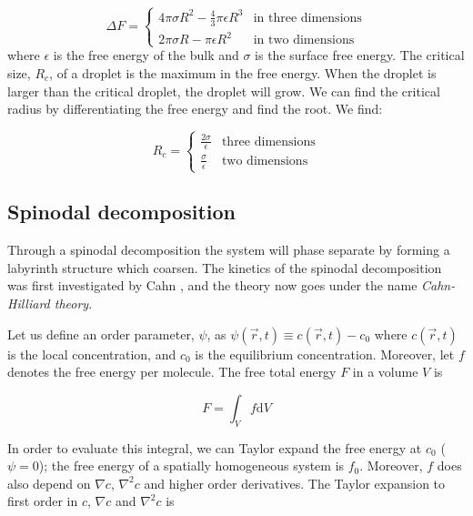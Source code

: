 \begin{equation}
  \Delta F =
    \begin{cases}
       4\pi \sigma R^2 - \frac{4}{3}\pi \epsilon R^3 &\text{in three
                    dimensions} \\
       2\pi \sigma R - \pi \epsilon R^2 &\text{in two dimensions}
    \end{cases}
\end{equation}
where $\epsilon$ is the free energy of the bulk and $\sigma$ is the
surface free energy. The critical size, $R_c$, of a droplet is the
maximum in the free energy. When the droplet is larger than the
critical droplet, the droplet will grow. We can find the critical
radius by differentiating the free energy and find the root. We find:

\begin{equation}
  R_c =
  \begin{cases}
    \frac{2\sigma}{\epsilon} &\text{three dimensions} \\
    \frac{\sigma}{\epsilon}  &\text{two dimensions}
  \end{cases}
\end{equation}


\subsection{Spinodal decomposition}
\label{sect:CahnHilliard}
Through a spinodal decomposition the system will phase separate by
forming a labyrinth structure which coarsen. The kinetics of the spinodal
decomposition was first investigated by Cahn \etal \cite{Cahn58}, and
the theory now goes under the name \textit{Cahn-Hilliard theory}. 

Let us define an order parameter, $\psi$, as $\psi(\vec{r}, t) \equiv
c(\vec{r}, t) - c_0$ where $c(\vec{r}, t)$ is the local concentration,
and $c_0$ is the equilibrium concentration. Moreover, let $f$ denotes
the free energy per molecule. The free total energy $F$ in a volume $V$ is

\begin{equation}
\label{eq:CHintegral}
  F = \int_V f \mathrm{d}V
\end{equation}

In order to evaluate this integral, we can Taylor expand the free
energy at $c_0$ ($\psi = 0$); the free energy of a spatially homogeneous system is
$f_0$. Moreover, $f$ does also depend on $\nabla c$, $\nabla^2 c$ and higher
order derivatives. The Taylor expansion to first order in $c$, $\nabla c$ and
$\nabla^2 c$ is

